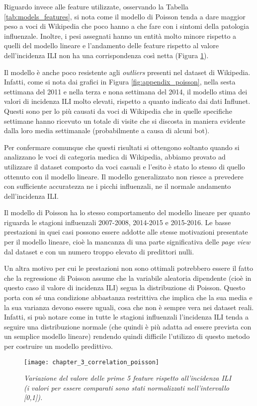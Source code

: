 Riguardo invece alle feature utilizzate, osservando la Tabella \ref{tab:models_features}, si nota come il modello di 
Poisson tenda a dare maggior peso a voci di Wikipedia che poco hanno a che fare con i sintomi della patologia influenzale. 
Inoltre, i pesi assegnati hanno un entità molto minore rispetto a quelli del modello lineare e  
l'andamento delle feature rispetto al valore dell'incidenza ILI non ha una corrispondenza così netta (Figura 
\ref{fig:ch_3_correlation_poisson}).
\bigskip

Il modello è anche poco resistente agli \textit{outliers} presenti nel dataset di Wikipedia. Infatti, come si nota dai 
grafici in Figura \ref{fig:appendix_poisson}, nella sesta settimana del 2011 e
nella terza e nona settimana del 2014, il modello stima dei valori di incidenza ILI molto elevati, rispetto a quanto indicato 
dai dati Influnet. Questi sono per lo più causati da voci di Wikipedia che in quelle specifiche settimane hanno ricevuto un 
totale di visite che si discosta in maniera evidente dalla loro media settimanale (probabilmente a causa di alcuni bot).
\bigskip 

Per confermare comunque che questi risultati si ottengono soltanto quando si analizzano le voci di categoria medica di 
Wikipedia, abbiamo provato ad utilizzare il dataset composto da voci casuali e l'esito è stato lo stesso di quello ottenuto 
con il modello lineare. Il modello generalizzato non riesce a prevedere con sufficiente accuratezza ne i picchi influenzali, 
ne il normale andamento dell'incidenza ILI. 
\bigskip

Il modello di Poisson ha lo stesso comportamento del modello lineare per quanto riguarda le stagioni influenzali 2007-2008, 
2014-2015 e 2015-2016. Le basse prestazioni in quei casi possono essere addotte alle stesse motivazioni presentate per il 
modello lineare, cioè la mancanza di una parte significativa delle \textit{page view} dal dataset e con un numero troppo 
elevato di predittori nulli.
\bigskip

Un altra motivo per cui le prestazioni non sono ottimali potrebbero essere il fatto che la regressione di Poisson assume 
che la variabile aleatoria dipendente (cioè in questo caso il valore di incidenza ILI) segua la distribuzione di Poisson. 
Questo porta con sé una condizione abbastanza restrittiva che implica che la sua media e la sua varianza devono essere 
uguali, cosa che non è sempre vera nei dataset reali. Infatti, si può notare come in tutte le stagioni influenzali 
l'incidenza ILI tenda a seguire una distribuzione normale (che quindi è più adatta ad essere prevista con un semplice modello 
lineare) rendendo quindi difficile l'utilizzo di questo metodo per costruire un modello predittivo.
\bigskip

\begin{figure}[h]
\texttt{[image: chapter\_3\_correlation\_poisson]}
\caption{\textit{Variazione del valore delle prime 5 feature rispetto all'incidenza ILI (i valori per essere comparati sono stati normalizzati nell'intervallo [0,1]).}}
\label{fig:ch_3_correlation_poisson}
\centering
\end{figure}

\clearpage